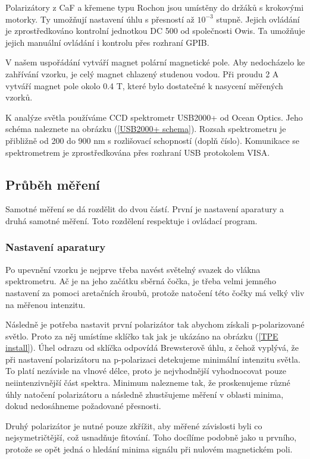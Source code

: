 Polarizátory z CaF a křemene typu Rochon jsou umístěny do držáků s krokovými motorky.  Ty umožňují nastavení úhlu s přesností až $10^{-3}$ stupně. Jejich ovládání je zprostředkováno kontrolní jednotkou DC 500 od společnosti Owis. Ta umožňuje jejich manuální ovládání i kontrolu přes rozhraní GPIB.

V našem uspořádání vytváří magnet polární magnetické pole. Aby nedocházelo ke zahřívání vzorku, je celý magnet chlazený studenou vodou. Při proudu 2 A vytváří magnet pole okolo 0.4 T, které bylo dostatečné k nasycení měřených vzorků. %

K analýze světla používáme CCD spektrometr USB2000+ od Ocean Optics. Jeho schéma naleznete na obrázku (\ref{USB2000+ schema}). Rozsah spektrometru je přibližně od 200 do 900 nm s rozlišovací schopností (doplň číslo). Komunikace se spektrometrem je zprostředkována přes rozhraní USB protokolem VISA. 

\subsection{Průběh měření}
Samotné měření se dá rozdělit do dvou částí. První je nastavení aparatury a druhá samotné měření. Toto rozdělení respektuje i ovládací program.
\subsubsection{Nastavení aparatury}
Po upevnění vzorku je nejprve třeba navést světelný svazek do vlákna spektrometru. Ač je na jeho začátku sběrná čočka, je třeba velmi jemného nastavení za pomoci aretačních šroubů, protože natočení této čočky má velký vliv na měřenou intenzitu.

Následně je potřeba nastavit první polarizátor tak abychom získali p-polarizované světlo. Proto za něj umístíme sklíčko tak jak je ukázáno na obrázku (\ref{TPE install}). Úhel odrazu od sklíčka odpovídá Brewsterově úhlu, z čehož vyplývá, že při nastavení polarizátoru na p-polarizaci detekujeme minimální intenzitu světla. To platí nezávisle na vlnové délce, proto je nejvhodnější vyhodnocovat pouze neiintenzivnější část spektra. Minimum nalezneme tak, že proskenujeme různé úhly natočení polarizátoru a následně zhustšujeme měření v oblasti minima, dokud nedosáhneme požadované přesnosti.

Druhý polarizátor je nutné pouze zkřížit, aby měřené závislosti byli co nejsymetričtější, což usnadňuje fitování. Toho docílíme podobně jako u prvního, protože se opět jedná o hledání minima signálu při nulovém magnetickém poli.

